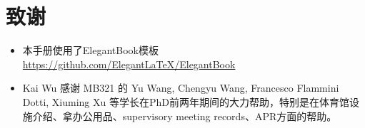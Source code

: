 \chapter{致谢}
\begin{itemize}
    \item 本手册使用了ElegantBook模板 \url{https://github.com/ElegantLaTeX/ElegantBook}
    \item Kai Wu 感谢 MB321 的 Yu Wang, Chengyu Wang, Francesco Flammini Dotti, Xiuming Xu 等学长在PhD前两年期间的大力帮助，特别是在体育馆设施介绍、拿办公用品、supervisory meeting records、APR方面的帮助。
\end{itemize}





